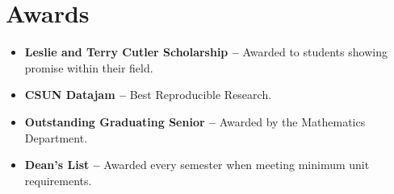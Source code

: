 \documentclass[letterpaper,11pt]{article}
\newcommand{\resumeItem}[1]{
  \item\small{
    {#1 \vspace{-2pt}}
  }
}
\newcommand{\resumeSubItem}[2]{\resumeItem{\textbf{#1 --}\hspace{-7pt}}{#2}\vspace{-4pt}}
\newcommand{\resumeSubHeadingListStart}{\begin{itemize}[leftmargin=*]}
\newcommand{\resumeSubHeadingListEnd}{\end{itemize}}
\begin{document}
\section{Awards}
  \resumeSubHeadingListStart
  	\resumeSubItem{Leslie and Terry Cutler Scholarship}{Awarded to students showing promise within their field.}
  	\resumeSubItem{CSUN Datajam}{Best Reproducible Research.}
    \resumeSubItem{Outstanding Graduating Senior}{Awarded by the Mathematics Department.}
    \resumeSubItem{Dean's List}
      {Awarded every semester when meeting minimum unit requirements.}  
  \resumeSubHeadingListEnd

%


\end{document}
